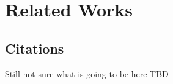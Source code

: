\chapter{Related Works}
\label{cha:related_works}

\section{Citations}
\label{cha:examples_citations} Still not sure what is going to be here TBD
